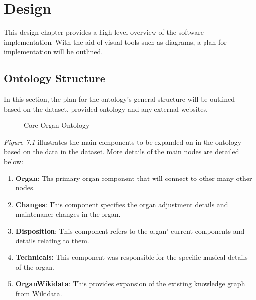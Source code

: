 \chapter{Design}
This design chapter provides a high-level overview of the software implementation. With the aid of visual tools such as diagrams, a plan for implementation will be outlined. 

\section{Ontology Structure}
In this section, the plan for the ontology's general structure will be outlined based on the dataset, provided ontology and any external websites. 

\begin{figure}[H]
    \begin{center}
    \end{center}
    \vspace{-0.4cm}
\caption{Core Organ Ontology}
\end{figure}
\vspace{-0.1cm}

\textit{Figure 7.1} illustrates the main components to be expanded on in the ontology based on the data in the dataset. More details of the main nodes are detailed below:

\begin{enumerate}
    \item \textbf{Organ}: The primary organ component that will connect to other many other nodes.
    \item \textbf{Changes}: This component specifies the organ adjustment details and maintenance changes in the organ.
    \item \textbf{Disposition}: This component refers to the organ' current components and details relating to them.
    \item \textbf{Technicals:} This component was responsible for the specific musical details of the organ. 
    \item \textbf{OrganWikidata}: This provides expansion of the existing knowledge graph from Wikidata.
\end{enumerate}

